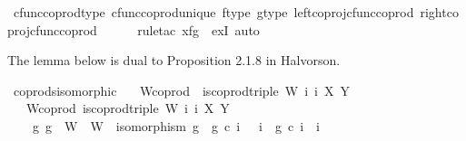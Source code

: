 \begin{isabellebody}
\ cfunc{\isacharunderscore}{\kern0pt}coprod{\isacharunderscore}{\kern0pt}type\ cfunc{\isacharunderscore}{\kern0pt}coprod{\isacharunderscore}{\kern0pt}unique\ f{\isacharunderscore}{\kern0pt}type\ g{\isacharunderscore}{\kern0pt}type\ left{\isacharunderscore}{\kern0pt}coproj{\isacharunderscore}{\kern0pt}cfunc{\isacharunderscore}{\kern0pt}coprod\ right{\isacharunderscore}{\kern0pt}coproj{\isacharunderscore}{\kern0pt}cfunc{\isacharunderscore}{\kern0pt}coprod\ \isanewline
\ \ \ \ \isamarkupfalse%
{\isacharparenleft}{\kern0pt}rule{\isacharunderscore}{\kern0pt}tac\ x{\isacharequal}{\kern0pt}{\isachardoublequoteopen}f{\isasymamalg}g{\isachardoublequoteclose}\ \ exI{\isacharcomma}{\kern0pt}\ auto{\isacharparenright}{\kern0pt}\isanewline
{}\isamarkupfalse%
%
\endisatagproof
{\isafoldproof}%
%
\isadelimproof
%
\endisadelimproof
%
\begin{isamarkuptext}%
The lemma below is dual to Proposition 2.1.8 in Halvorson.%
\end{isamarkuptext}\isamarkuptrue%
\isamarkupfalse%
\ coprods{\isacharunderscore}{\kern0pt}isomorphic{\isacharcolon}{\kern0pt}\isanewline
\ \ \ W{\isacharunderscore}{\kern0pt}coprod{\isacharcolon}{\kern0pt}\ \ {\isachardoublequoteopen}is{\isacharunderscore}{\kern0pt}coprod{\isacharunderscore}{\kern0pt}triple\ {\isacharparenleft}{\kern0pt}W{\isacharcomma}{\kern0pt}\ i\ i\ X\ Y{\isachardoublequoteclose}\isanewline
\ \ \ W{\isacharprime}{\kern0pt}{\isacharunderscore}{\kern0pt}coprod{\isacharcolon}{\kern0pt}\ {\isachardoublequoteopen}is{\isacharunderscore}{\kern0pt}coprod{\isacharunderscore}{\kern0pt}triple\ {\isacharparenleft}{\kern0pt}W{\isacharprime}{\kern0pt}{\isacharcomma}{\kern0pt}\ i{\isacharprime}{\kern0pt}\ i{\isacharprime}{\kern0pt}\ X\ Y{\isachardoublequoteclose}\isanewline
\ \ \ {\isachardoublequoteopen}{\isasymexists}\ g{\isachardot}{\kern0pt}\ g\ {\isacharcolon}{\kern0pt}\ W\ {\isasymrightarrow}\ W{\isacharprime}{\kern0pt}\ {\isasymand}\ isomorphism\ g\ {\isasymand}\ g\ {\isasymcirc}\isactrlsub c\ i\ \ {\isacharequal}{\kern0pt}\ i{\isacharprime}{\kern0pt}\ {\isasymand}\ g\ {\isasymcirc}\isactrlsub c\ i\ {\isacharequal}{\kern0pt}\ i{\isacharprime}{\kern0pt}\isanewline

\end{isabellebody}
